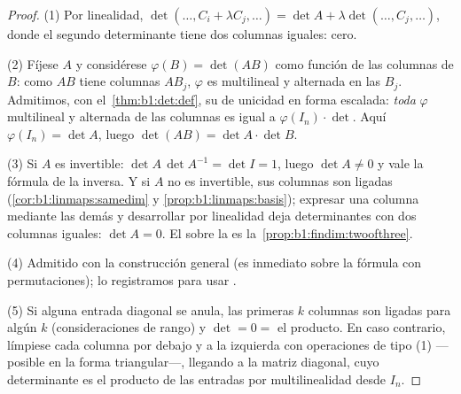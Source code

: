 \begin{proof}
(1) Por linealidad,
$\det(\dots, C_i + \lambda C_j, \dots) = \det A +
\lambda\det(\dots, C_j, \dots)$, donde el segundo determinante tiene
dos columnas iguales: cero.

(2) Fíjese $A$ y considérese $\varphi(B) = \det(AB)$ como función de
las columnas de $B$: como $AB$ tiene columnas $AB_j$, $\varphi$ es
multilineal y alternada en las $B_j$. Admitimos, con
el~\cref{thm:b1:det:def}, su  de unicidad en forma escalada:
\emph{toda}  $\varphi$ multilineal y alternada de las
columnas es igual a $\varphi(I_n) \cdot \det$. Aquí
$\varphi(I_n) = \det A$, luego $\det(AB) = \det A \cdot \det B$.

(3) Si $A$ es invertible: $\det A\,\det A^{-1} = \det I = 1$, luego
$\det A \neq 0$ y vale la fórmula de la inversa. Y si $A$ no es
invertible, sus columnas son ligadas
(\cref{cor:b1:linmaps:samedim} y \cref{prop:b1:linmaps:basis});
expresar una columna mediante las demás y desarrollar por linealidad
deja determinantes con dos columnas iguales: $\det A = 0$. El
 sobre la  es la~\cref{prop:b1:findim:twoofthree}.

(4) Admitido con la construcción general (es inmediato sobre la
fórmula con permutaciones); lo registramos para usar
.

(5) Si alguna entrada diagonal se anula, las primeras $k$ columnas
son ligadas para algún $k$ (consideraciones de rango) y
$\det = 0 = $ el producto. En caso contrario, límpiese cada columna
por debajo y a la izquierda con operaciones de tipo (1) ---posible en
la forma triangular---, llegando a la matriz diagonal, cuyo
determinante es el producto de las entradas por multilinealidad desde
$I_n$.
\end{proof}

